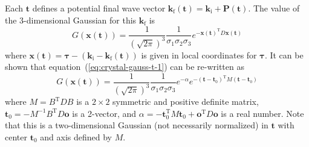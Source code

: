 Each $\boldsymbol{t}$ defines a potential final wave vector
$\boldsymbol{k}_\textrm{f}(\boldsymbol{t}) = \boldsymbol{k}_\textrm{i} +
\boldsymbol{P}(\boldsymbol{t})$. The value of the 3-dimensional Gaussian
for this $\boldsymbol{k}_\textrm{f}$ is
\begin{equation}
  \label{eq:crystal-gauss-t-1}
  G(\boldsymbol{x}(\boldsymbol{t})) =
  \frac{1}{(\sqrt{2\pi})^3}\frac{1}{\sigma_1\sigma_2\sigma_3}
  e^{-\boldsymbol{x}(\boldsymbol{t})^\textrm{T} D \boldsymbol{x}(\boldsymbol{t})}
\end{equation}
where $\boldsymbol{x}(\boldsymbol{t}) = \boldsymbol{\tau} -
(\boldsymbol{k}_\textrm{i} - \boldsymbol{k}_\textrm{f}(\boldsymbol{t}))$ is
given in local coordinates for $\boldsymbol{\tau}$. It can be shown that
equation~(\ref{eq:crystal-gauss-t-1}) can be re-written as
\begin{equation}
  \label{eq:crystal-gauss-2}
  G(\boldsymbol{x}(\boldsymbol{t})) =
  \frac{1}{(\sqrt{2\pi})^3}\frac{1}{\sigma_1\sigma_2\sigma_3} e^{-\alpha}
  e^{-(\boldsymbol{t}-\boldsymbol{t}_0)^\textrm{T} M
    (\boldsymbol{t}-\boldsymbol{t}_0)}
\end{equation}
where $M = B^\textrm{T} D B$ is a $2 \times 2$ symmetric and positive
definite matrix, $\boldsymbol{t}_0 = -M^{-1}B^\textrm{T} D \boldsymbol{o}$
is a 2-vector, and $\alpha = -\boldsymbol{t}_0^\textrm{T} M
\boldsymbol{t}_0 + \boldsymbol{o}^\textrm{T} D \boldsymbol{o}$ is a real
number.  Note that this is a two-dimensional Gaussian (not necessarily
normalized) in $\boldsymbol{t}$ with center $\boldsymbol{t}_0$ and axis
defined by $M$.

